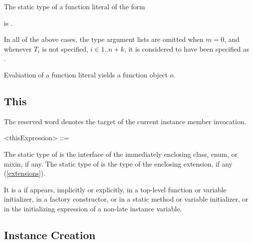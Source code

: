 \documentclass[makeidx]{article}
\begin{document}
{\LMHash{}%
The static type of a function literal of the form

\noindent
\code{<\TypeParametersStd>}

\noindent
{}

\noindent
is
.
\EndCase

\LMHash{}%
In all of the above cases,
the type argument lists are omitted when $m=0$,
and whenever $T_i$ is not specified, $i \in 1 .. n+k$,
it is considered to have been specified as \DYNAMIC.

\LMHash{}%
Evaluation of a function literal yields a function object $o$.



\subsection{This}

\LMHash{}%
The reserved word \THIS{} denotes
the target of the current instance member invocation.

\begin{grammar}
<thisExpression> ::= \THIS{}
\end{grammar}

\LMHash{}%
The static type of \THIS{} is the interface of the
immediately enclosing class, enum, or mixin, if any.
The static type of \THIS{} is
the \ON{} type of the enclosing extension, if any
(\ref{extensions}).


\LMHash{}%
It is a  if \THIS{} appears, implicitly or explicitly,
in a top-level function or variable initializer, in a factory constructor,
or in a static method or variable initializer,
or in the initializing expression of a non-late instance variable.


\subsection{Instance Creation}

}
\end{document}
